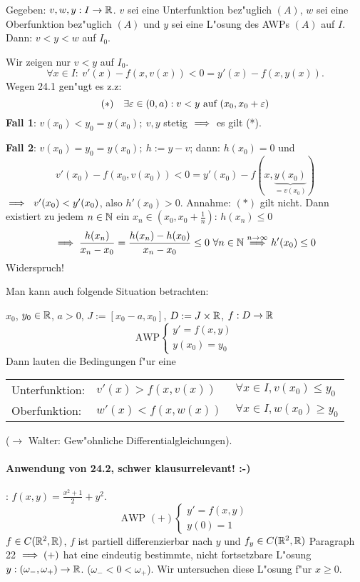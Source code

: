 \documentclass[a4paper,twoside,DIV15,BCOR12mm]{scrbook}
\begin{document}
\begin{satz}
Gegeben: $v,w,y:I\to\mathbb{R}$. $v$ sei eine Unterfunktion bez"uglich $(A)$, $w$ sei eine Oberfunktion
bez"uglich $(A)$ und $y$ sei eine L"osung des AWPs $(A)$ auf $I$. Dann: $v<y<w$ auf $I_0$.
\end{satz}
\begin{beweis}
Wir zeigen nur $v<y$ auf $I_0$.
\[
	\forall x\in I:\ v'(x)-f(x, v(x))<0=y'(x)-f(x,y(x)).
\]
Wegen 24.1 gen"ugt es z.z:
\[
	(*)\quad \exists\varepsilon\in(0,a): v<y\text{ auf } (x_0, x_0+\varepsilon)
\]
\textbf{Fall 1}: $v(x_0)<y_0=y(x_0);\ v,y$ stetig $\implies$ es gilt (*).

\textbf{Fall 2}: $v(x_0)=y_0=y(x_0);\ h:=y-v$; dann: $h(x_0)=0$ und
\[
	v'(x_0)-f(x_0, v(x_0))<0=y'(x_0)-f(x,\underbrace{y(x_0)}_{=v(x_0)})
\]
$\implies\ v'(x_0)<y'(x_0)$, also $h'(x_0)>0$.
Annahme: $(*)$ gilt nicht. Dann existiert zu jedem $n\in\mathbb{N}$ ein $x_n\in(x_0, x_0+\frac{1}{n})$: $h(x_n)\le 0$
\[
	\implies \frac{h(x_n)}{x_n-x_0}=\frac{h(x_n)-h(x_0)}{x_n-x_0}\le 0\ \forall n\in\mathbb{N}\overset{n\to\infty}{\implies}h'(x_0)\le 0
\]
Widerspruch!
\end{beweis}

\begin{bemerkung}
Man kann auch folgende Situation betrachten:

$x_0$, $y_0\in\mathbb{R}$, $a>0$, $J:=[x_0-a, x_0]$, $D:=J\times\mathbb{R}$, $f:D\to\mathbb{R}$
\[
	\text{AWP}\begin{cases}
		y'=f(x,y)\\
		y(x_0)=y_0
	\end{cases}
\]
Dann lauten die Bedingungen f"ur eine

\begin{tabular}{lll}
Unterfunktion:&$v'(x)>f(x,v(x))$&$\ \forall x\in I, v(x_0)\le y_0$\\
Oberfunktion:&$w'(x)<f(x,w(x))$&$\ \forall x\in I, w(x_0)\ge y_0$
\end{tabular}

($\to$ Walter: Gew"ohnliche Differentialgleichungen).
\end{bemerkung}
\paragraph{Anwendung von 24.2, schwer klausurrelevant! :-)}: $f(x,y) = \frac{x^2+1}{2}+y^2$.
\[
	\text{AWP }(+) \begin{cases}
		y'=f(x,y)\\
		y(0)=1
	\end{cases}
\]
$f\in C(\mathbb{R}^2,\mathbb{R})$, $f$ ist partiell differenzierbar nach $y$ und $f_y\in C(\mathbb{R}^2, \mathbb{R})$
Paragraph 22 $\implies (+)$ hat eine eindeutig bestimmte, nicht fortsetzbare L"osung $y:(\omega_-, \omega_+)\to\mathbb{R}$.
($\omega_-<0<\omega_+$). Wir untersuchen diese L"osung f"ur $x\ge 0$.
\end{document}
